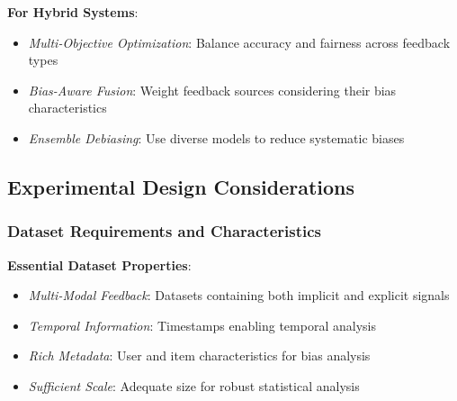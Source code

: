 \textbf{For Hybrid Systems}:
\begin{itemize}
    \item \textit{Multi-Objective Optimization}: Balance accuracy and fairness across feedback types
    \item \textit{Bias-Aware Fusion}: Weight feedback sources considering their bias characteristics
    \item \textit{Ensemble Debiasing}: Use diverse models to reduce systematic biases
\end{itemize}

\subsection{Experimental Design Considerations}

\subsubsection{Dataset Requirements and Characteristics}

\textbf{Essential Dataset Properties}:
\begin{itemize}
    \item \textit{Multi-Modal Feedback}: Datasets containing both implicit and explicit signals
    \item \textit{Temporal Information}: Timestamps enabling temporal analysis
    \item \textit{Rich Metadata}: User and item characteristics for bias analysis
    \item \textit{Sufficient Scale}: Adequate size for robust statistical analysis
\end{itemize}

